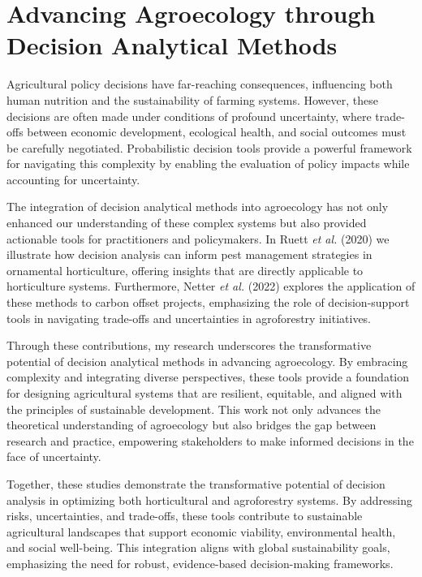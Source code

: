 \documentclass[
]{article}
\begin{document}
\newpage

\hypertarget{chapter_one}{%
\section{Advancing Agroecology through Decision Analytical
Methods}\label{chapter_one}}

Agricultural policy decisions have far-reaching consequences,
influencing both human nutrition and the sustainability of farming
systems. However, these decisions are often made under conditions of
profound uncertainty, where trade-offs between economic development,
ecological health, and social outcomes must be carefully negotiated.
Probabilistic decision tools provide a powerful framework for navigating
this complexity by enabling the evaluation of policy impacts while
accounting for uncertainty.

The integration of decision analytical methods into agroecology has not
only enhanced our understanding of these complex systems but also
provided actionable tools for practitioners and policymakers. In Ruett
\emph{et al.} (2020) we illustrate how decision analysis can inform pest
management strategies in ornamental horticulture, offering insights that
are directly applicable to horticulture systems. Furthermore, Netter
\emph{et al.} (2022) explores the application of these methods to carbon
offset projects, emphasizing the role of decision-support tools in
navigating trade-offs and uncertainties in agroforestry initiatives.

Through these contributions, my research underscores the transformative
potential of decision analytical methods in advancing agroecology. By
embracing complexity and integrating diverse perspectives, these tools
provide a foundation for designing agricultural systems that are
resilient, equitable, and aligned with the principles of sustainable
development. This work not only advances the theoretical understanding
of agroecology but also bridges the gap between research and practice,
empowering stakeholders to make informed decisions in the face of
uncertainty.

Together, these studies demonstrate the transformative potential of
decision analysis in optimizing both horticultural and agroforestry
systems. By addressing risks, uncertainties, and trade-offs, these tools
contribute to sustainable agricultural landscapes that support economic
viability, environmental health, and social well-being. This integration
aligns with global sustainability goals, emphasizing the need for
robust, evidence-based decision-making frameworks.
\end{document}
